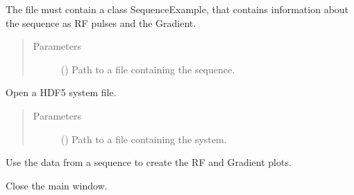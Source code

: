 \documentclass[a4paper,10pt,english]{sphinxmanual}
\begin{document}
\begin{fulllineitems}
\begin{fulllineitems}
The file must contain a class SequenceExample, that contains
information about the sequence as RF pulses and the Gradient.
\begin{quote}\begin{description}
\item[{Parameters}] \leavevmode
{} () \textendash{} Path to a file containing the sequence.

\end{description}\end{quote}

\end{fulllineitems}


\begin{fulllineitems}
\label{\detokenize{autodoc/mrsprint/mrsprint:mrsprint.mainwindow.MainWindow.openSystem}}
Open a HDF5 system file.
\begin{quote}\begin{description}
\item[{Parameters}] \leavevmode
{} () \textendash{} Path to a file containing the system.

\end{description}\end{quote}

\end{fulllineitems}


\begin{fulllineitems}
\label{\detokenize{autodoc/mrsprint/mrsprint:mrsprint.mainwindow.MainWindow.plotSequence}}
Use the data from a sequence to create the RF and Gradient plots.

\end{fulllineitems}


\begin{fulllineitems}
\label{\detokenize{autodoc/mrsprint/mrsprint:mrsprint.mainwindow.MainWindow.quit}}
Close the main window.


\end{fulllineitems}
\end{fulllineitems}
\end{document}
